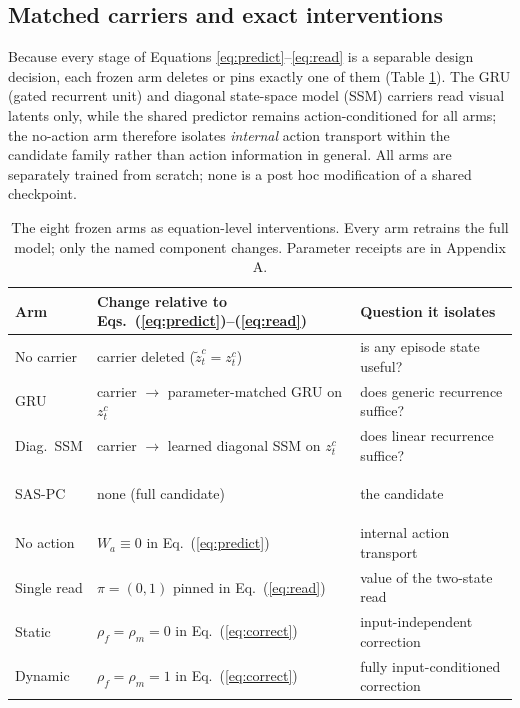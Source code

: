 \subsection{Matched carriers and exact
interventions}\label{matched-carriers-and-exact-interventions}

Because every stage of Equations \ref{eq:predict}--\ref{eq:read} is a
separable design decision, each frozen arm deletes or pins exactly one
of them (Table \ref{tbl:arms}). The GRU (gated recurrent unit) and
diagonal state-space model (SSM) carriers read visual latents only,
while the shared predictor remains action-conditioned for all arms; the
no-action arm therefore isolates \emph{internal} action transport within
the candidate family rather than action information in general. All arms
are separately trained from scratch; none is a post hoc modification of
a shared checkpoint.

\begin{table}[!b]
\centering
\caption{The eight frozen arms as equation-level interventions. Every arm retrains the full model; only the named component changes. Parameter receipts are in Appendix A.}
\label{tbl:arms}
\footnotesize
\setlength{\tabcolsep}{5pt}
\begin{tabular}{@{}lll@{}}
\toprule
\textcolor{NVIDIADark}{\textbf{Arm}} & \textcolor{NVIDIADark}{\textbf{Change relative to Eqs.~(\ref{eq:predict})--(\ref{eq:read})}} & \textcolor{NVIDIADark}{\textbf{Question it isolates}} \\
\midrule
No carrier & carrier deleted (\(\tilde z_t^c=z_t^c\)) & is any episode state useful? \\
GRU & carrier \(\to\) parameter-matched GRU on \(z_t^c\) & does generic recurrence suffice? \\
Diag.\ SSM & carrier \(\to\) learned diagonal SSM on \(z_t^c\) & does linear recurrence suffice? \\
\colorbox{NVIDIAPale}{\strut SAS-PC} & none (full candidate) & the candidate \\
No action & \(W_a\equiv0\) in Eq.~(\ref{eq:predict}) & internal action transport \\
Single read & \(\pi=(0,1)\) pinned in Eq.~(\ref{eq:read}) & value of the two-state read \\
Static & \(\rho_f=\rho_m=0\) in Eq.~(\ref{eq:correct}) & input-independent correction \\
Dynamic & \(\rho_f=\rho_m=1\) in Eq.~(\ref{eq:correct}) & fully input-conditioned correction \\
\bottomrule
\end{tabular}
\end{table}

